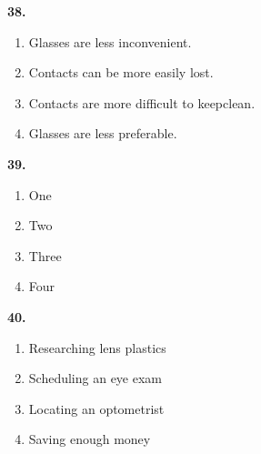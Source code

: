 \documentclass[12pt]{article}
\begin{document}
\par
\vspace{0.25\baselineskip}
\noindent\textbf{38.}
\begin{enumerate}[label=(\Alph*),leftmargin=*,itemsep=0.2em]
\item Glasses are less inconvenient.
\item Contacts can be more easily lost.
\item Contacts are more difficult to keepclean.
\item Glasses are less preferable.
\end{enumerate}
\par
\vspace{0.25\baselineskip}
\noindent\textbf{39.}
\begin{enumerate}[label=(\Alph*),leftmargin=*,itemsep=0.2em]
\item One
\item Two
\item Three
\item Four
\end{enumerate}
\par
\vspace{0.25\baselineskip}
\noindent\textbf{40.}
\begin{enumerate}[label=(\Alph*),leftmargin=*,itemsep=0.2em]
\item Researching lens plastics
\item Scheduling an eye exam
\item Locating an optometrist
\item Saving enough money
\end{enumerate}
\par
\vspace{0.25\baselineskip}
\end{document}
